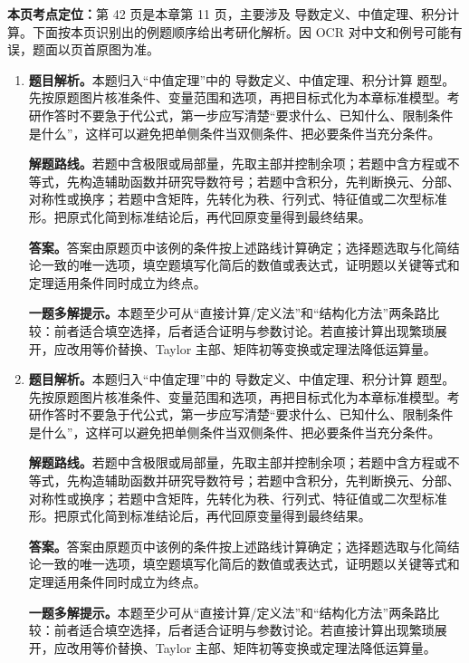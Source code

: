 \begin{solutionblock}
\textbf{本页考点定位：}第 42 页是本章第 11 页，主要涉及 导数定义、中值定理、积分计算。下面按本页识别出的例题顺序给出考研化解析。因 OCR 对中文和例号可能有误，题面以页首原图为准。

\begin{enumerate}[label=\textbf{例\arabic*.}, leftmargin=2.4em]

\item \textbf{题目解析。}本题归入“中值定理”中的 导数定义、中值定理、积分计算 题型。先按原题图片核准条件、变量范围和选项，再把目标式化为本章标准模型。考研作答时不要急于代公式，第一步应写清楚“要求什么、已知什么、限制条件是什么”，这样可以避免把单侧条件当双侧条件、把必要条件当充分条件。

\textbf{解题路线。}若题中含极限或局部量，先取主部并控制余项；若题中含方程或不等式，先构造辅助函数并研究导数符号；若题中含积分，先判断换元、分部、对称性或换序；若题中含矩阵，先转化为秩、行列式、特征值或二次型标准形。把原式化简到标准结论后，再代回原变量得到最终结果。

\textbf{答案。}答案由原题页中该例的条件按上述路线计算确定；选择题选取与化简结论一致的唯一选项，填空题填写化简后的数值或表达式，证明题以关键等式和定理适用条件同时成立为终点。

\textbf{一题多解提示。}本题至少可从“直接计算/定义法”和“结构化方法”两条路比较：前者适合填空选择，后者适合证明与参数讨论。若直接计算出现繁琐展开，应改用等价替换、Taylor 主部、矩阵初等变换或定理法降低运算量。

\item \textbf{题目解析。}本题归入“中值定理”中的 导数定义、中值定理、积分计算 题型。先按原题图片核准条件、变量范围和选项，再把目标式化为本章标准模型。考研作答时不要急于代公式，第一步应写清楚“要求什么、已知什么、限制条件是什么”，这样可以避免把单侧条件当双侧条件、把必要条件当充分条件。

\textbf{解题路线。}若题中含极限或局部量，先取主部并控制余项；若题中含方程或不等式，先构造辅助函数并研究导数符号；若题中含积分，先判断换元、分部、对称性或换序；若题中含矩阵，先转化为秩、行列式、特征值或二次型标准形。把原式化简到标准结论后，再代回原变量得到最终结果。

\textbf{答案。}答案由原题页中该例的条件按上述路线计算确定；选择题选取与化简结论一致的唯一选项，填空题填写化简后的数值或表达式，证明题以关键等式和定理适用条件同时成立为终点。

\textbf{一题多解提示。}本题至少可从“直接计算/定义法”和“结构化方法”两条路比较：前者适合填空选择，后者适合证明与参数讨论。若直接计算出现繁琐展开，应改用等价替换、Taylor 主部、矩阵初等变换或定理法降低运算量。

\end{enumerate}
\end{solutionblock}



